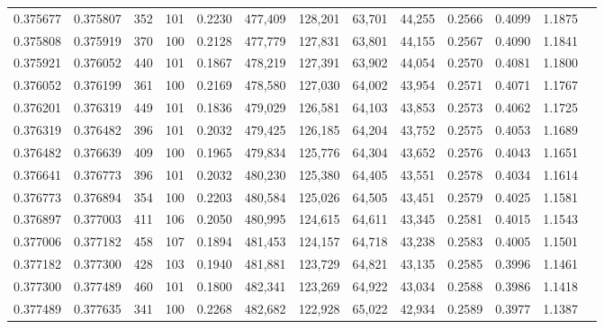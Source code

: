 \begin{tabular}{rrrrrrrrrrrrr}
0.375677 & 0.375807 &   352 & 101 &                                     0.2230 & 477,409 & 128,201 &  63,701 &  44,255 & 0.2566 & 0.4099 & 1.1875 \\
0.375808 & 0.375919 &   370 & 100 &                                     0.2128 & 477,779 & 127,831 &  63,801 &  44,155 & 0.2567 & 0.4090 & 1.1841 \\
0.375921 & 0.376052 &   440 & 101 &                                     0.1867 & 478,219 & 127,391 &  63,902 &  44,054 & 0.2570 & 0.4081 & 1.1800 \\
0.376052 & 0.376199 &   361 & 100 &                                     0.2169 & 478,580 & 127,030 &  64,002 &  43,954 & 0.2571 & 0.4071 & 1.1767 \\
0.376201 & 0.376319 &   449 & 101 &                                     0.1836 & 479,029 & 126,581 &  64,103 &  43,853 & 0.2573 & 0.4062 & 1.1725 \\
0.376319 & 0.376482 &   396 & 101 &                                     0.2032 & 479,425 & 126,185 &  64,204 &  43,752 & 0.2575 & 0.4053 & 1.1689 \\
0.376482 & 0.376639 &   409 & 100 &                                     0.1965 & 479,834 & 125,776 &  64,304 &  43,652 & 0.2576 & 0.4043 & 1.1651 \\
0.376641 & 0.376773 &   396 & 101 &                                     0.2032 & 480,230 & 125,380 &  64,405 &  43,551 & 0.2578 & 0.4034 & 1.1614 \\
0.376773 & 0.376894 &   354 & 100 &                                     0.2203 & 480,584 & 125,026 &  64,505 &  43,451 & 0.2579 & 0.4025 & 1.1581 \\
0.376897 & 0.377003 &   411 & 106 &                                     0.2050 & 480,995 & 124,615 &  64,611 &  43,345 & 0.2581 & 0.4015 & 1.1543 \\
0.377006 & 0.377182 &   458 & 107 &                                     0.1894 & 481,453 & 124,157 &  64,718 &  43,238 & 0.2583 & 0.4005 & 1.1501 \\
0.377182 & 0.377300 &   428 & 103 &                                     0.1940 & 481,881 & 123,729 &  64,821 &  43,135 & 0.2585 & 0.3996 & 1.1461 \\
0.377300 & 0.377489 &   460 & 101 &                                     0.1800 & 482,341 & 123,269 &  64,922 &  43,034 & 0.2588 & 0.3986 & 1.1418 \\
0.377489 & 0.377635 &   341 & 100 &                                     0.2268 & 482,682 & 122,928 &  65,022 &  42,934 & 0.2589 & 0.3977 & 1.1387 \\

\end{tabular}
